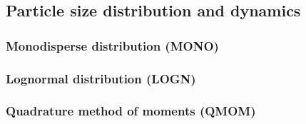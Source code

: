 \documentclass[preprint,12pt,letterpaper]{elsarticle}
\begin{document}
\subsection{Particle size distribution and dynamics}
\label{ss:PSD_dynamics}



\begin{table}
    \caption{Summary of soot particle size distribution models implemented in SootLib.}
    \label{t:psd_models}
    \centering
\end{table}

\subsubsection{Monodisperse distribution (MONO)}
\label{sss:mono}

\subsubsection{Lognormal distribution (LOGN)}
\label{sss:logn}

\subsubsection{Quadrature method of moments (QMOM)}
\label{sss:qmom}
\end{document}
